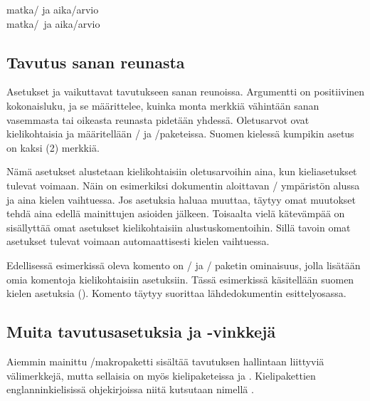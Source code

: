 \begin{tulossis}
  matka\-/{} ja aika\-/arvio \\
  matka\-/\ ja aika\-/arvio
\end{tulossis}

\subsection{Tavutus sanan reunasta}

Asetukset  ja 
vaikuttavat tavutukseen sanan reunoissa. Argumentti  on
positiivinen kokonaisluku, ja se määrittelee, kuinka monta merkkiä
vähintään sanan vasemmasta tai oikeasta reunasta pidetään yhdessä.
Oletusarvot ovat kielikohtaisia ja määritellään
\-/{} ja \-/paketeissa. Suomen
kielessä kumpikin asetus on kaksi (2) merkkiä.

Nämä asetukset alustetaan kielikohtaisiin oletusarvoihin aina, kun
kieliasetukset tulevat voimaan. Näin on esimerkiksi dokumentin
aloittavan \-/ ympäristön alussa ja aina kielen
vaihtuessa. Jos asetuksia haluaa muuttaa, täytyy omat muutokset tehdä
aina edellä mainittujen asioiden jälkeen. Toisaalta vielä kätevämpää on
sisällyttää omat asetukset kielikohtaisiin alustuskomentoihin. Sillä
tavoin omat asetukset tulevat voimaan automaattisesti kielen vaihtuessa.

\begin{koodilohkosis}
\end{koodilohkosis}

Edellisessä esimerkissä oleva komento  on
\-/{} ja \-/ paketin ominaisuus,
jolla lisätään omia komentoja kielikohtaisiin asetuksiin. Tässä
esimerkissä käsitellään suomen kielen asetuksia
(). Komento täytyy suorittaa lähdedokumentin
esittelyosassa.

\subsection{Muita tavutusasetuksia ja -vinkkejä}
\label{luku:tavutus_muut}

Aiemmin mainittu \-/makropaketti sisältää tavutuksen
hallintaan liittyviä välimerkkejä, mutta sellaisia on myös
kielipaketeissa  ja . Kielipakettien
englanninkielisissä ohjekirjoissa niitä kutsutaan nimellä
\emph{}.

